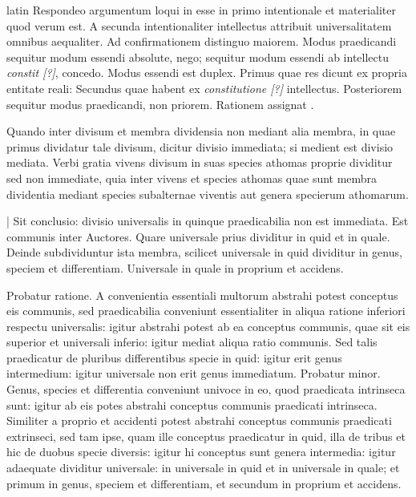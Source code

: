 \begin{otherlanguage*}{latin}
\pstart
Respondeo argumentum loqui in esse in primo intentionale et materialiter quod verum est. A secunda intentionaliter intellectus attribuit universalitatem omnibus aequaliter. Ad confirmationem distinguo maiorem. Modus praedicandi sequitur modum essendi absolute, nego; sequitur modum essendi ab intellectu \emph{constit [?]}, concedo. Modus essendi est duplex. Primus quae res dicunt ex propria entitate reali:
Secundus quae habent ex \emph{constitutione [?]} intellectus. Posteriorem sequitur modus praedicandi, non priorem. Rationem assignat . 
\pend

\pstart
{}
\pend

\pstart
Quando inter divisum et membra dividensia non mediant alia membra, in quae primus dividatur tale divisum, dicitur divisio immediata; si medient est divisio mediata. Verbi gratia vivens divisum in suas species athomas proprie dividitur sed non immediate, quia inter vivens et species athomas quae sunt membra dividentia mediant species subalternae viventis aut genera specierum athomarum. 
\pend

\pstart
\textnormal{|} Sit conclusio:
divisio universalis in quinque praedicabilia non est immediata. Est communis inter Auctores. Quare universale prius dividitur in quid et in quale. Deinde subdividuntur ista membra, scilicet universale in quid dividitur in genus, speciem et differentiam. Universale in quale in proprium et accidens. 
\pend

\pstart
Probatur ratione. A convenientia essentiali multorum abstrahi potest conceptus eis communis, sed praedicabilia conveniunt essentialiter in aliqua ratione inferiori respectu universalis:
igitur abstrahi potest ab ea conceptus communis, quae sit eis superior et universali inferio:
igitur mediat aliqua ratio communis. Sed talis praedicatur de pluribus differentibus specie in quid:
igitur erit genus intermedium:
igitur universale non erit genus immediatum. Probatur minor. Genus, species et differentia conveniunt univoce in eo, quod praedicata intrinseca sunt:
igitur ab eis potes abstrahi conceptus communis praedicati intrinseca. Similiter a proprio et accidenti potest abstrahi conceptus communis praedicati extrinseci, sed tam ipse, quam ille conceptus praedicatur in quid, illa de tribus et hic de duobus specie diversis:
igitur hi conceptus sunt genera intermedia:
igitur adaequate dividitur universale:
in universale in quid et in universale in quale; et primum in genus, speciem et differentiam, et secundum in proprium et accidens. 
\pend


\end{otherlanguage*}
